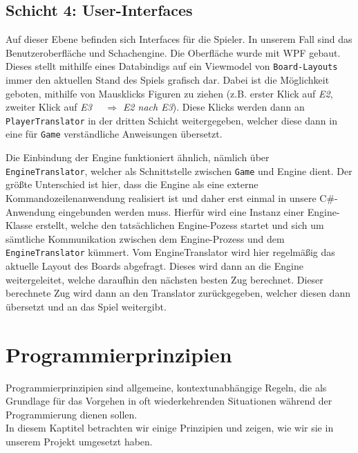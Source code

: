 \documentclass[
10pt, %
a4paper, %
oneside, %
headinclude,footinclude, %
BCOR5mm, %
]{scrartcl}
\begin{document}
\begin{onehalfspace}
\subsection{Schicht 4: User-Interfaces}
Auf dieser Ebene befinden sich Interfaces für die Spieler. In unserem Fall sind das Benutzeroberfläche und Schachengine. Die Oberfläche wurde mit WPF gebaut. Dieses stellt mithilfe eines Databindigs auf ein Viewmodel von \texttt{Board-Layouts} immer den aktuellen Stand des Spiels grafisch dar. 
Dabei ist die Möglichkeit geboten, mithilfe von Mausklicks Figuren zu ziehen (z.B. erster Klick auf \textit{E2}, zweiter Klick auf \textit{E3}~~ $\Rightarrow$ \textit{E2 nach E3}). Diese Klicks werden dann an \texttt{PlayerTranslator} in der dritten Schicht weitergegeben, welcher diese dann in eine für \texttt{Game} verständliche Anweisungen übersetzt.

Die Einbindung der Engine funktioniert ähnlich, nämlich über \texttt{EngineTranslator}, welcher als Schnittstelle zwischen \texttt{Game} und Engine dient. Der größte Unterschied ist hier, dass die Engine als eine externe Kommandozeilenanwendung realisiert ist und daher erst einmal in unsere C\#-Anwendung eingebunden werden muss.
Hierfür wird eine Instanz einer Engine-Klasse erstellt, welche den tatsächlichen Engine-Pozess startet und sich um sämtliche Kommunikation zwischen dem Engine-Prozess und dem \texttt{EngineTranslator} kümmert. Vom EngineTranslator wird hier regelmäßig das aktuelle Layout des Boards abgefragt. Dieses wird dann an die Engine weitergeleitet, welche daraufhin den nächsten besten Zug berechnet. Dieser berechnete Zug wird dann an den Translator zurückgegeben, welcher diesen dann übersetzt und an das Spiel weitergibt.
\newpage
\section{Programmierprinzipien}
Programmierprinzipien sind allgemeine, kontextunabhängige Regeln, die als Grundlage für das Vorgehen in oft wiederkehrenden Situationen während der Programmierung dienen sollen.\\
In diesem Kaptitel betrachten wir einige Prinzipien und zeigen, wie wir sie in unserem Projekt umgesetzt haben.

\end{onehalfspace}
\end{document}
